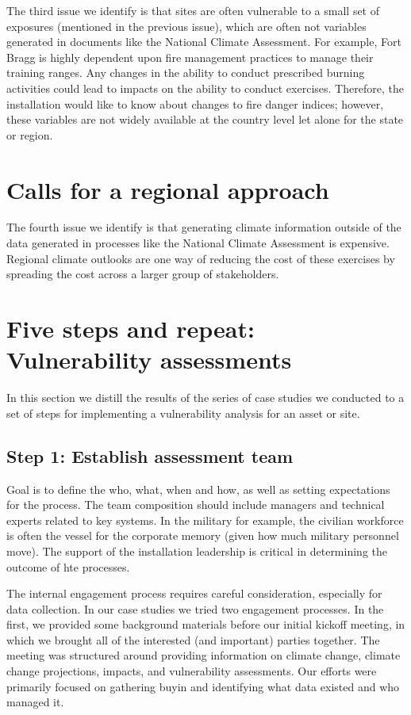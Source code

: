 \documentclass[10pt]{amsart}
\begin{document}
The third issue we identify is that sites are often vulnerable to a small set of exposures (mentioned in the previous issue), which are often not variables generated in documents like the National Climate Assessment.
For example, Fort Bragg is highly dependent upon fire management practices to manage their training ranges. 
Any changes in the ability to conduct prescribed burning activities could lead to impacts on the ability to conduct exercises.
Therefore, the installation would like to know about changes to fire danger indices; however, these variables are not widely available at the country level let alone for the state or region.

\section{Calls for a regional approach}
The fourth issue we identify is that generating climate information outside of the data generated in processes like the National Climate Assessment is expensive.
Regional climate outlooks are one way of reducing the cost of these exercises by spreading the cost across a larger group of stakeholders.


\section{Five steps and repeat: Vulnerability assessments}
In this section we distill the results of the series of case studies we conducted to a set of steps for implementing a vulnerability analysis for an asset or site. 

\subsection{Step 1: Establish assessment team}
Goal is to define the who, what, when and how, as well as setting expectations for the process.
The team composition should include managers and technical experts related to key systems.
In the military for example, the civilian workforce is often the vessel for the corporate memory (given how much military personnel move).
The support of the installation leadership is critical in determining the outcome of hte processes. 

The internal engagement process requires careful consideration, especially for data collection.
In our case studies we tried two engagement processes.
In the first, we provided some background materials before our initial kickoff meeting, in which we brought all of the interested (and important) parties together.
The meeting was structured around providing information on climate change, climate change projections, impacts, and vulnerability assessments.
Our efforts were primarily focused on gathering buyin and identifying what data existed and who managed it. 
\end{document}
